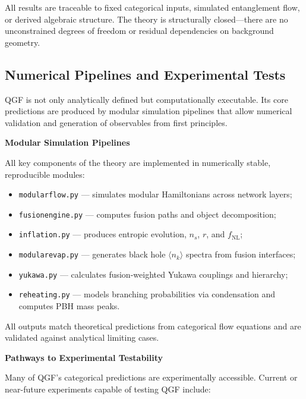 \documentclass[11pt]{article}
\def\_{}
\begin{document}
All results are traceable to fixed categorical inputs, simulated entanglement flow, or derived algebraic structure. The theory is structurally closed—there are no unconstrained degrees of freedom or residual dependencies on background geometry.



\subsection{Numerical Pipelines and Experimental Tests}

QGF is not only analytically defined but computationally executable. Its core predictions are produced by modular simulation pipelines that allow numerical validation and generation of observables from first principles.

\vspace{0.5em}
\noindent\textbf{Modular Simulation Pipelines}

All key components of the theory are implemented in numerically stable, reproducible modules:

\begin{itemize}
  \item \texttt{modular\_flow.py} — simulates modular Hamiltonians across network layers;
  \item \texttt{fusion\_engine.py} — computes fusion paths and object decomposition;
  \item \texttt{inflation.py} — produces entropic evolution, \( n_s \), \( r \), and \( f_{\text{NL}} \);
  \item \texttt{modular\_evap.py} — generates black hole \( \langle n_k \rangle \) spectra from fusion interfaces;
  \item \texttt{yukawa.py} — calculates fusion-weighted Yukawa couplings and hierarchy;
  \item \texttt{reheating.py} — models branching probabilities via condensation and computes PBH mass peaks.
\end{itemize}

All outputs match theoretical predictions from categorical flow equations and are validated against analytical limiting cases.

\vspace{0.5em}
\noindent\textbf{Pathways to Experimental Testability}

Many of QGF's categorical predictions are experimentally accessible. Current or near-future experiments capable of testing QGF include:
\end{document}

